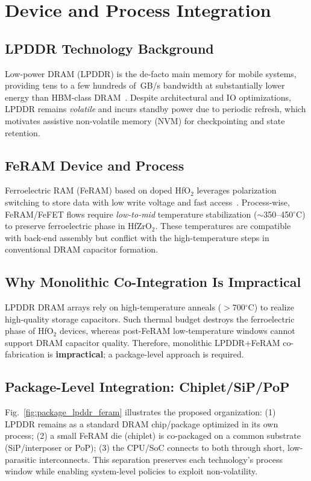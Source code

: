 \section{Device and Process Integration}

\subsection{LPDDR Technology Background}
Low-power DRAM (LPDDR) is the de-facto main memory for mobile systems, providing tens to a few hundreds of~GB/s bandwidth at substantially lower energy than HBM-class DRAM~\cite{ChoiIEDM2022}. 
Despite architectural and IO optimizations, LPDDR remains \emph{volatile} and incurs standby power due to periodic refresh, which motivates assistive non-volatile memory (NVM) for checkpointing and state retention.

\subsection{FeRAM Device and Process}
Ferroelectric RAM (FeRAM) based on doped HfO$_2$ leverages polarization switching to store data with low write voltage and fast access~\cite{NohedaNature2023,KimIEDM2021}. 
Process-wise, FeRAM/FeFET flows require \emph{low-to-mid} temperature stabilization ($\sim$350--450$^\circ$C) to preserve ferroelectric phase in HfZrO$_2$.
These temperatures are compatible with back-end assembly but conflict with the high-temperature steps in conventional DRAM capacitor formation.

\subsection{Why Monolithic Co-Integration Is Impractical}
LPDDR DRAM arrays rely on high-temperature anneals ($>$700$^\circ$C) to realize high-quality storage capacitors. 
Such thermal budget destroys the ferroelectric phase of HfO$_2$ devices, whereas post-FeRAM low-temperature windows cannot support DRAM capacitor quality. 
Therefore, monolithic LPDDR+FeRAM co-fabrication is \textbf{impractical}; a package-level approach is required.

\subsection{Package-Level Integration: Chiplet/SiP/PoP}
Fig.~\ref{fig:package_lpddr_feram} illustrates the proposed organization:
(1) LPDDR remains as a standard DRAM chip/package optimized in its own process; 
(2) a small FeRAM die (chiplet) is co-packaged on a common substrate (SiP/interposer or PoP); 
(3) the CPU/SoC connects to both through short, low-parasitic interconnects.
This separation preserves each technology's process window while enabling system-level policies to exploit non-volatility.

